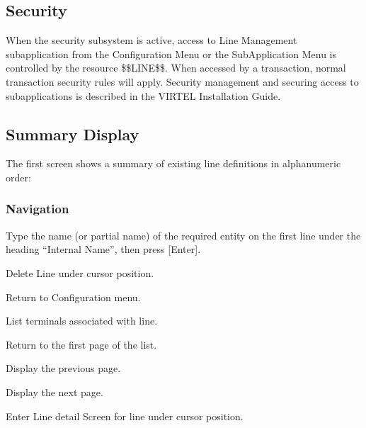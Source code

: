 \documentclass[letterpaper,10pt,english]{sphinxmanual}
\begin{document}
\subsection{Security}
\label{\detokenize{connectivity_guide:security}}
\sphinxAtStartPar
When the security subsystem is active, access to Line Management sub\sphinxhyphen{}application from the Configuration Menu or the Sub\sphinxhyphen{}Application Menu is controlled by the resource \$\$LINE\$\$.
When accessed by a transaction, normal transaction security rules will apply. Security management and securing access to sub\sphinxhyphen{}applications is described in the VIRTEL Installation Guide.

\ignorespaces 

\subsection{Summary Display}
\label{\detokenize{connectivity_guide:summary-display}}\label{\detokenize{connectivity_guide:index-6}}
\sphinxAtStartPar
The first screen shows a summary of existing line definitions in alphanumeric order:

\sphinxAtStartPar
{}


\subsubsection{Navigation}
\label{\detokenize{connectivity_guide:navigation}}\begin{description}
\sphinxAtStartPar
Type the name (or partial name) of the required entity on the first line under the heading “Internal Name”, then press {[}Enter{]}.

\sphinxlineitem{{[}PF2{]}}
\sphinxAtStartPar
Delete Line under cursor position.

\sphinxlineitem{{[}PF3{]}}
\sphinxAtStartPar
Return to Configuration menu.

\sphinxlineitem{{[}PF4{]}}
\sphinxAtStartPar
List terminals associated with line.

\sphinxlineitem{{[}PF6{]}}
\sphinxAtStartPar
Return to the first page of the list.

\sphinxlineitem{{[}PF7{]}}
\sphinxAtStartPar
Display the previous page.

\sphinxlineitem{{[}PF8{]}}
\sphinxAtStartPar
Display the next page.

\sphinxlineitem{{[}PF12{]}}
\sphinxAtStartPar
Enter Line detail Screen for line under cursor position.

\end{description}
\end{document}
